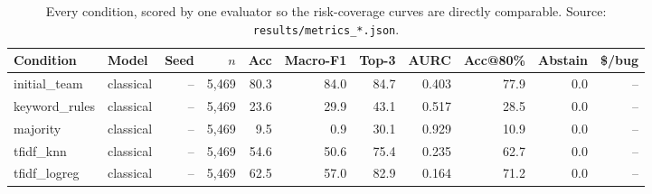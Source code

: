\begin{table}[t]\centering
\caption{Every condition, scored by one evaluator so the risk-coverage curves are directly comparable. Source: \texttt{results/metrics\_*.json}.}
\label{tab:conditions-test}
\begin{tabular}{llrrrrrrrrr}
\toprule
Condition & Model & Seed & $n$ & Acc & Macro-F1 & Top-3 & AURC & Acc@80\% & Abstain & \$/bug \\
\midrule
initial\_team & classical & -- & 5{,}469 & 80.3 & 84.0 & 84.7 & 0.403 & 77.9 & 0.0 & -- \\
keyword\_rules & classical & -- & 5{,}469 & 23.6 & 29.9 & 43.1 & 0.517 & 28.5 & 0.0 & -- \\
majority & classical & -- & 5{,}469 & 9.5 & 0.9 & 30.1 & 0.929 & 10.9 & 0.0 & -- \\
tfidf\_knn & classical & -- & 5{,}469 & 54.6 & 50.6 & 75.4 & 0.235 & 62.7 & 0.0 & -- \\
tfidf\_logreg & classical & -- & 5{,}469 & 62.5 & 57.0 & 82.9 & 0.164 & 71.2 & 0.0 & -- \\
\bottomrule
\end{tabular}
\end{table}
